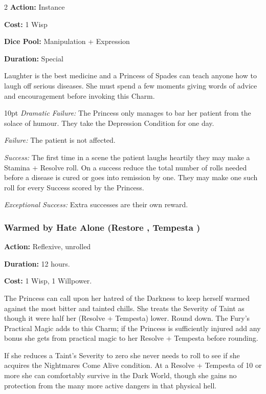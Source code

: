 \begin{multicols}{2}
\noindent \textbf{Action:} Instance

\noindent \textbf{Cost:} 1 Wisp

\noindent \textbf{Dice Pool:} Manipulation + Expression

\noindent \textbf{Duration:} Special

\noindent Laughter is the best medicine and a Princess of Spades can teach anyone how to laugh off serious diseases. She must spend a few moments giving words of advice and encouragement before invoking this Charm. 

\begin{myindentpar}{10pt}    \emph{Dramatic Failure:} The Princess only manages to bar her patient from the solace of humour. They take the Depression Condition for one day.

    \emph{Failure:} The patient is not affected.

    \emph{Success:} The first time in a scene the patient laughs heartily they may make a Stamina + Resolve roll. On a success reduce the total number of rolls needed before a disease is cured or goes into remission by one. They may make one such roll for every Success scored by the Princess. 

    \emph{Exceptional Success:} Extra successes are their own reward.

    \end{myindentpar}

\subsubsection*{Warmed by Hate Alone (Restore \textbullet, Tempesta \textbullet\textbullet)}

\noindent \textbf{Action:} Reflexive, unrolled

\noindent \textbf{Duration:} 12 hours.

\noindent \textbf{Cost:} 1 Wisp, 1 Willpower.

The Princess can call upon her hatred of the Darkness to keep herself warmed against the most bitter and tainted chills. She treats the Severity of Taint as though it were half her (Resolve + Tempesta) lower. Round down. The Fury's Practical Magic adds to this Charm; if the Princess is sufficiently injured add any bonus she gets from practical magic to her Resolve + Tempesta before rounding.

If she reduces a Taint's Severity to zero she never needs to roll to see if she acquires the Nightmares Come Alive condition. At a Resolve + Tempesta of 10 or more she can comfortably survive in the Dark World, though she gains no protection from the many more active dangers in that physical hell.


\end{multicols}
